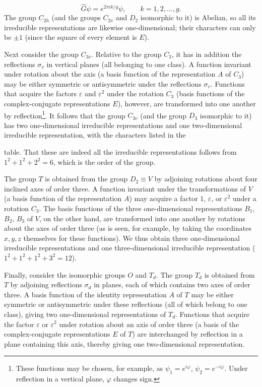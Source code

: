 
\[
\widehat G\psi=e^{2\pi ik/g}\psi,\qquad k=1,2,\ldots,g.
\]
The group $C_{2h}$ (and the groups $C_{2v}$ and $D_2$ isomorphic to it) is Abelian, so all its irreducible representations are likewise one-dimensional; their characters can only be $\pm1$ (since the square of every element is $E$).

Next consider the group $C_{3v}$. Relative to the group $C_3$, it has in addition the reflections $\sigma_v$ in vertical planes (all belonging to one class). A function invariant under rotation about the axis (a basis function of the representation $A$ of $C_3$) may be either symmetric or antisymmetric under the reflections $\sigma_v$. Functions that acquire the factors $\varepsilon$ and $\varepsilon^2$ under the rotation $C_3$ (basis functions of the complex-conjugate representations $E$), however, are transformed into one another by reflection\footnote{These functions may be chosen, for example, as $\psi_1=e^{i\varphi}$, $\psi_2=e^{-i\varphi}$. Under reflection in a vertical plane, $\varphi$ changes sign.}. It follows that the group $C_{3v}$ (and the group $D_3$ isomorphic to it) has two one-dimensional irreducible representations and one two-dimensional irreducible representation, with the characters listed in the

table. That these are indeed all the irreducible representations follows from $1^2+1^2+2^2=6$, which is the order of the group.



The group $T$ is obtained from the group $D_2\equiv V$ by adjoining rotations about four inclined axes of order three. A function invariant under the transformations of $V$ (a basis function of the representation $A$) may acquire a factor $1$, $\varepsilon$, or $\varepsilon^2$ under a rotation $C_3$. The basis functions of the three one-dimensional representations $B_1$, $B_2$, $B_3$ of $V$, on the other hand, are transformed into one another by rotations about the axes of order three (as is seen, for example, by taking the coordinates $x,y,z$ themselves for these functions). We thus obtain three one-dimensional irreducible representations and one three-dimensional irreducible representation ($1^2+1^2+1^2+3^2=12$).

Finally, consider the isomorphic groups $O$ and $T_d$. The group $T_d$ is obtained from $T$ by adjoining reflections $\sigma_d$ in planes, each of which contains two axes of order three. A basis function of the identity representation $A$ of $T$ may be either symmetric or antisymmetric under these reflections (all of which belong to one class), giving two one-dimensional representations of $T_d$. Functions that acquire the factor $\varepsilon$ or $\varepsilon^2$ under rotation about an axis of order three (a basis of the complex-conjugate representations $E$ of $T$) are interchanged by reflection in a plane containing this axis, thereby giving one two-dimensional representation.

